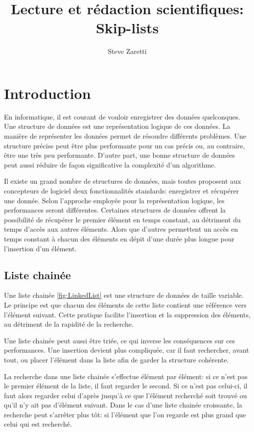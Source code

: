 \documentclass[hidelinks,a4paper, 12pt]{article}
\title{Lecture et rédaction scientifiques: \\Skip-lists }
\author{Steve Zaretti}
\begin{document}
	
	\maketitle
	\newpage
	\tableofcontents
	\newpage
	
	\section{Introduction}
	En informatique, il est courant de vouloir enregistrer des données quelconques. Une structure de données est une représentation logique de ces données. La manière de représenter les données permet de résoudre  différents problèmes. Une structure précise peut être plus performante pour un cas précis ou, au contraire, être une très peu performante. D'autre part, une bonne structure de données peut aussi réduire de façon significative la complexité d'un algorithme.
	
	Il existe un grand nombre de structures de données, mais toutes proposent aux concepteurs de logiciel deux fonctionnalités standards: enregistrer et récupérer une donnée. Selon l'approche employée pour la représentation logique, les performances seront différentes. Certaines structures de données offrent la possibilité de récupérer le premier élément en temps constant, au détriment du temps d'accès aux autres éléments. Alors que d'autres permettent un accès en temps constant à chacun des éléments en dépit d'une durée plus longue pour l'insertion d'un élément.
	
	\subsection{Liste chainée}
	Une liste chainée \ref{fig:LinkedList} est une structure de données de taille variable. Le principe est que chacun des éléments de cette liste contient une référence vers l'élément suivant. Cette pratique facilite l'insertion et la suppression des éléments, au détriment de la rapidité de la recherche.
	
	Une liste chainée peut aussi être triée, ce qui inverse les conséquences sur ces performances. Une insertion devient plus compliquée, car il faut rechercher, avant tout, ou placer l'élément dans la liste afin de garder la structure cohérente.
	
	La recherche dans une liste chainée s'effectue élément par élément: si ce n'est pas le premier élément de la liste, il faut regarder le second. Si ce n'est pas celui-ci, il faut alors regarder celui d'après jusqu'à ce que l'élément recherché soit trouvé ou qu'il n'y ait pas d'élément suivant. Dans le cas d'une liste chainée croissante, la recherche peut s'arrêter plus tôt: si l'élément que l'on regarde est plus grand que celui qui est recherché.
	
\end{document}
